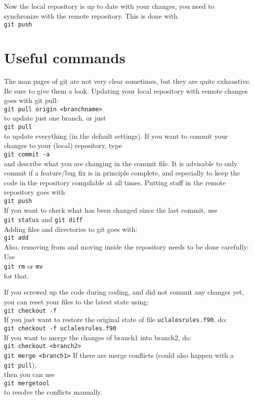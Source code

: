 \documentclass[a4paper,10pt]{article}
\begin{document}
Now the local repository is up to date with your changes, you need to synchronize with the remote repository. This is done with \\
\verb|git push|\\



\section{Useful commands}
The man pages of git are not very clear sometimes, but they are quite exhaustive. Be sure to give them a look.
Updating your local repository with remote changes goes with git pull:\\
\verb|git pull origin <branchname>|\\ to update just one branch, or just\\ \verb|git pull |\\ to update everything (in the default settings).
If you want to commit your changes to your (local) repository, type\\
\verb|git commit -a|\\
and describe what you are changing in the commit file. It is advisable to only commit if a feature/bug fix is in principle complete, and especially to keep the code in the repository compilable at all times. Putting stuff in the remote repository goes with \\
\verb|git push|\\
If you want to check what has been changed since the last commit, use\\ \verb|git status| and \verb|git diff| \\
Adding files and directories to git goes with:\\ \verb|git add|\\
Also, removing from and moving inside the repository needs to be done carefully: Use\\ \verb|git rm| or \verb|mv|\\ for that.

If you screwed up the code during coding, and did not commit any changes yet, you can reset your files to the latest state using:\\
\verb|git checkout -f|\\
If you just want to restore the original state of file \verb|uclalesrules.f90|, do:\\
\verb|git checkout -f uclalesrules.f90|\\

If you want to merge the changes of branch1 into branch2, do:\\
\verb|git checkout <branch2>|\\
\verb|git merge <branch1>|
If there are merge conflicts (could also happen with a\\ \verb|git pull|),\\ then you can use\\ \verb|git mergetool|\\ to resolve the conflicts manually.
\end{document}
